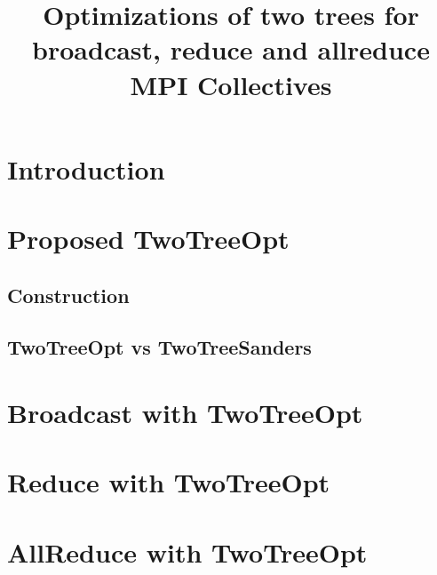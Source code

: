 \documentclass[sigconf]{acmart}
\renewcommand{\goal}[1]{}
\begin{document}
\title{Optimizations of two trees for broadcast, reduce and allreduce MPI Collectives}

%


\begin{abstract}

\end{abstract}

\maketitle

\section{Introduction}
\goal{Describe Collective communication and advantages of improving Two Tree algorithm}

\section{Proposed TwoTreeOpt}

\subsection{Construction}

\subsection{TwoTreeOpt vs TwoTreeSanders}

\section{Broadcast with TwoTreeOpt}

\section{Reduce with TwoTreeOpt}

\section{AllReduce with TwoTreeOpt}


 
\end{document}
